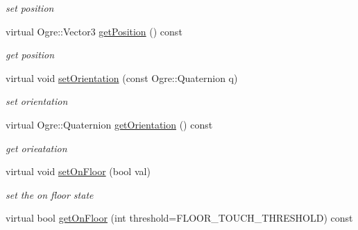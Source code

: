\begin{DoxyCompactItemize}
\begin{DoxyCompactList}\small\item\em set position \end{DoxyCompactList}\item 
virtual Ogre\+::\+Vector3 \hyperlink{class_n_c_t_u_1_1_obstacle_a64c40f6470a9ad47c6441ddef7f8cc62}{get\+Position} () const \hypertarget{class_n_c_t_u_1_1_obstacle_a64c40f6470a9ad47c6441ddef7f8cc62}{}\label{class_n_c_t_u_1_1_obstacle_a64c40f6470a9ad47c6441ddef7f8cc62}

\begin{DoxyCompactList}\small\item\em get position \end{DoxyCompactList}\item 
virtual void \hyperlink{class_n_c_t_u_1_1_obstacle_aa68682ec1330c69bf6093699a42610ff}{set\+Orientation} (const Ogre\+::\+Quaternion q)\hypertarget{class_n_c_t_u_1_1_obstacle_aa68682ec1330c69bf6093699a42610ff}{}\label{class_n_c_t_u_1_1_obstacle_aa68682ec1330c69bf6093699a42610ff}

\begin{DoxyCompactList}\small\item\em set orientation \end{DoxyCompactList}\item 
virtual Ogre\+::\+Quaternion \hyperlink{class_n_c_t_u_1_1_obstacle_aadc30d1638cee2b7eb76fb83cd84cfc2}{get\+Orientation} () const \hypertarget{class_n_c_t_u_1_1_obstacle_aadc30d1638cee2b7eb76fb83cd84cfc2}{}\label{class_n_c_t_u_1_1_obstacle_aadc30d1638cee2b7eb76fb83cd84cfc2}

\begin{DoxyCompactList}\small\item\em get orieatation \end{DoxyCompactList}\item 
virtual void \hyperlink{class_n_c_t_u_1_1_obstacle_aa7271e6282b29e9604e1e36c033c5260}{set\+On\+Floor} (bool val)\hypertarget{class_n_c_t_u_1_1_obstacle_aa7271e6282b29e9604e1e36c033c5260}{}\label{class_n_c_t_u_1_1_obstacle_aa7271e6282b29e9604e1e36c033c5260}

\begin{DoxyCompactList}\small\item\em set the on floor state \end{DoxyCompactList}\item 
virtual bool \hyperlink{class_n_c_t_u_1_1_obstacle_ad286ab7a7891af2fdbe68509414a7091}{get\+On\+Floor} (int threshold=F\+L\+O\+O\+R\+\_\+\+T\+O\+U\+C\+H\+\_\+\+T\+H\+R\+E\+S\+H\+O\+LD) const \hypertarget{class_n_c_t_u_1_1_obstacle_ad286ab7a7891af2fdbe68509414a7091}{}\label{class_n_c_t_u_1_1_obstacle_ad286ab7a7891af2fdbe68509414a7091}


\end{DoxyCompactItemize}
